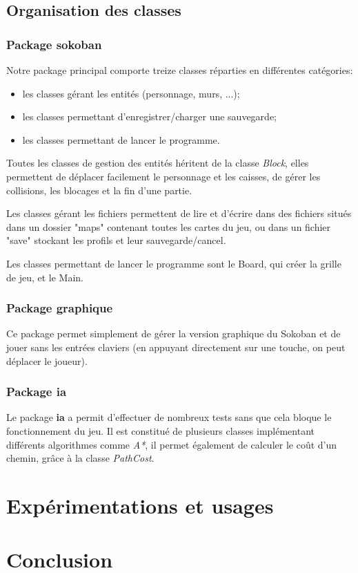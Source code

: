 \documentclass[a4paper,12pt]{article} %
\begin{document}
\subsection{Organisation des classes}

\subsubsection{Package sokoban}

Notre package principal comporte treize classes réparties en différentes catégories:
\begin{itemize}
\item les classes gérant les entités (personnage, murs, ...);
\item les classes permettant d'enregistrer/charger une sauvegarde;
\item les classes permettant de lancer le programme.
\end{itemize}

Toutes les classes de gestion des entités héritent de la classe \textit{Block}, elles permettent de déplacer facilement le personnage et les caisses, de gérer les collisions, les blocages et la fin d'une partie.

Les classes gérant les fichiers permettent de lire et d'écrire dans des fichiers situés dans un dossier "maps" contenant toutes les cartes du jeu, ou dans un fichier "save" stockant les profils et leur sauvegarde/cancel.

Les classes permettant de lancer le programme sont le Board, qui créer la grille de jeu, et le Main.

\subsubsection{Package graphique}

Ce package permet simplement de gérer la version graphique du Sokoban et de jouer sans les entrées claviers (en appuyant directement sur une touche, on peut déplacer le joueur).

\subsubsection{Package ia}

Le package \textbf{ia} a permit d'effectuer de nombreux tests sans que cela bloque le fonctionnement du jeu. Il est constitué de plusieurs classes implémentant différents algorithmes comme \textit{A*}, il permet également de calculer le coût d'un chemin, grâce à la classe \textit{PathCost}.

\section{Expérimentations et usages}

\section*{Conclusion}
\end{document}
